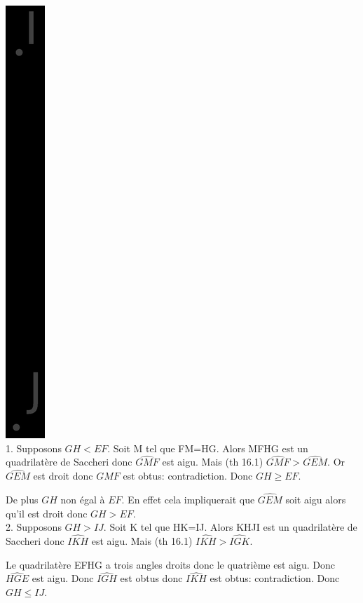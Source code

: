 \documentclass[a4paper, 12pt, twoside]{book}
\begin{document}
   
        \includegraphics[scale=0.1]{figures/Lobat31.eps}\\
        
        1. Supposons $GH<EF$. Soit M tel que FM=HG. Alors MFHG est un quadrilatère de Saccheri donc  $\hat{GMF}$  est aigu. Mais (th 16.1)  $\hat{GMF}>\hat{GEM}$. Or  $\hat{GEM}$ est droit donc $\hat{GMF}$ est obtus: contradiction. Donc $GH\geq EF$.\
        
        De plus $GH$ non égal à $EF$. En effet cela impliquerait que $\hat{GEM}$ soit aigu alors qu'il est droit donc  $GH>EF$.\\
         
        
        2. Supposons $GH>IJ$. Soit K tel que HK=IJ. Alors KHJI est un quadrilatère de Saccheri donc  $\hat{IKH}$  est aigu. Mais (th 16.1)  $\hat{IKH}>\hat{IGK}$.\
        
        Le quadrilatère EFHG a trois angles droits donc le quatrième est aigu. Donc $\hat{HGE}$ est aigu.  Donc $\hat{IGH}$ est obtus donc $\hat{IKH}$ est obtus: contradiction. Donc $GH\leq IJ$.\
        
\end{document}
